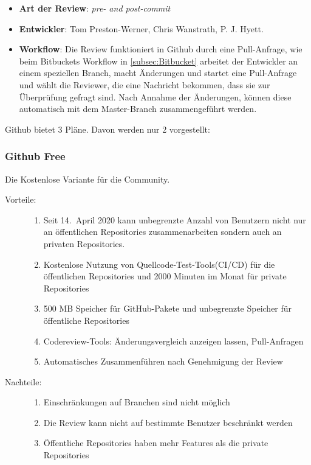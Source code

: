 \begin{itemize}
	\item \textbf{Art der Review}: \textit{pre- and post-commit}
	\item \textbf{Entwickler}: Tom Preston-Werner, Chris Wanstrath, P. J. Hyett.
	\item \textbf{Workflow}: Die Review funktioniert in Github durch eine Pull-Anfrage, wie beim Bitbuckets Workflow in \ref{subsec:Bitbucket} arbeitet der Entwickler an einem
		speziellen Branch, macht Änderungen und startet eine Pull-Anfrage und wählt die Reviewer, die eine Nachricht bekommen, dass sie zur Überprüfung gefragt sind. Nach Annahme der
		Änderungen, können diese automatisch mit dem Master-Branch zusammengeführt werden.
\end{itemize}

Github bietet 3 Pläne. Davon werden nur 2 vorgestellt:

\subsubsection{Github Free}
\label{subsubsec:Free}

Die Kostenlose Variante für die Community.
\begin{description}
	\item [Vorteile:] \hfill
	\begin{enumerate}
		\item Seit 14.~April 2020 kann unbegrenzte Anzahl von Benutzern nicht nur an öffentlichen Repositories zusammenarbeiten sondern auch an privaten Repositories.
		\item Kostenlose Nutzung von Quellcode-Test-Tools(\ac{CI}/\ac{CD}) für die öffentlichen Repositories und 2000 Minuten im Monat für private Repositories
		\item 500 MB Speicher für GitHub-Pakete und unbegrenzte Speicher für öffentliche Repositories
		\item Codereview-Tools: Änderungsvergleich anzeigen lassen, Pull-Anfragen
		\item Automatisches Zusammenführen nach Genehmigung der Review
	\end{enumerate}
	\item [Nachteile:] \hfill
	\begin{enumerate}
		\item Einschränkungen auf Branchen sind nicht möglich
		\item Die Review kann nicht auf bestimmte Benutzer beschränkt werden
		\item Öffentliche Repositories haben mehr Features als die private Repositories
	\end{enumerate}
\end{description}

